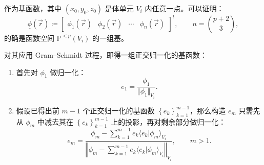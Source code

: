 作为基函数，其中 $(x_{0},y_{0},z_{0})$ 是体单元 $V_{i}$ 内任意一点。可以证明：
\begin{equation}
\underline{\phi}(\vec{r})\coloneqq\begin{bmatrix}\phi_{1}(\vec{r}) & \phi_{2}(\vec{r}) & \cdots & \phi_{n}(\vec{r})\end{bmatrix}^{t},\qquad n=\binom{p+2}{3},
\end{equation}
的确是函数空间 $\mathbb{P}^{<p}(V_{i})$ 的一组基。

对其应用 Gram–Schmidt 过程，即得一组正交归一化的基函数：
\begin{enumerate}[wide]
\item 首先对 $\phi_{1}$ 做归一化：
\begin{equation}
e_{1}=\frac{\phi_{1}}{\Vert\phi_{1}\Vert_{V_{i}}}.
\end{equation}
\item 假设已得出前 $m-1$ 个正交归一化的基函数 $\left\{ e_{k}\right\} _{k=1}^{m-1}$，那么构造
$e_{m}$ 只需先从 $\phi_{m}$ 中减去其在 $\left\{ e_{k}\right\} _{k=1}^{m-1}$
上的投影，再对剩余部分做归一化：
\begin{equation}
e_{m}=\frac{\phi_{m}-\sum_{k=1}^{m-1}e_{k}\langle e_{k}\vert\phi_{m}\rangle_{V_{i}}}{\left\Vert \phi_{m}-\sum_{k=1}^{m-1}e_{k}\langle e_{k}\vert\phi_{m}\rangle_{V_{i}}\right\Vert _{V_{i}}},\qquad m>1.\label{eq:ortho-normal}
\end{equation}
\end{enumerate}

